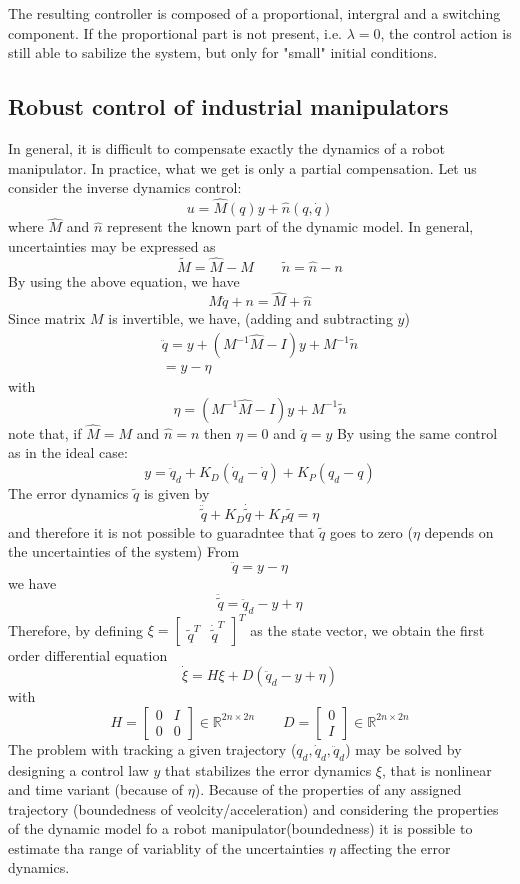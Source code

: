 \documentclass{book}
\begin{document}
The resulting controller is composed of a proportional, intergral and a switching component. If the proportional part is not present, i.e. $\lambda = 0$, the control action is still able to sabilize the system, but only for "small" initial conditions. 

\subsection{Robust control of industrial manipulators}
In general, it is difficult to compensate exactly the dynamics of a robot manipulator. In practice, what we get is only a partial compensation. Let us consider the inverse dynamics control:
\[
    u=\hat{M}(q)y+\hat{n}(q,\dot{q})
\]
where $\hat{M}$ and $\hat{n}$ represent the known part of the dynamic model. In general, uncertainties may be expressed as 
\[
    \tilde{M}=\hat{M}-M \qquad \tilde{n} = \hat{n} - n
\]
By using the above equation, we have
\[
    M\ddot{q}+n=\hat{M}+\hat{n}
\]
Since matrix $M$ is invertible, we have, (adding and subtracting $y$)
\begin{gather*}
    \ddot{q} = y + (M^{-1}\hat{M}-I)y+M^{-1}\tilde{n}\\
    =y-\eta
\end{gather*}
with
\[
    \eta = (M^{-1}\hat{M}-I)y+M^{-1}\tilde{n}
\]
note that, if $\hat{M}=M$ and $\hat{n}=n$ then $\eta=0$ and $\ddot{q}=y$
By using the same control as in the ideal case:
\[
    y=\ddot{q}_d+K_D(\dot{q}_d-\dot{q})+K_P(q_d-q)
\]
The error dynamics $\tilde{q}$ is given by 
\[
    \ddot{\tilde{q}}+K_D\dot{\tilde{q}} + K_P\tilde{q}=\eta
\]
and therefore it is not possible to guaradntee that $\tilde{q}$ goes to zero ($\eta$ depends on the uncertainties of the system)
From
\[
    \ddot{q}=y-\eta
\]
we have 
\[
    \ddot{\tilde{q}}=\ddot{q}_d-y+\eta
\]
Therefore, by defining $\xi = \begin{bmatrix}
    \tilde{q}^T  & \dot{\tilde{q}}^T
\end{bmatrix}^T $ as the state vector, we obtain the first order differential equation
\[
    \dot{\xi} = H\xi + D(\ddot{q}_d-y+\eta)
\]
with
\[
    H=\begin{bmatrix}
        0 & I \\ 0 & 0
    \end{bmatrix} \in \mathbb{R}^{2n\times 2n} \qquad D = \begin{bmatrix}
        0 \\ I
    \end{bmatrix} \in \mathbb{R}^{2n\times 2n}
\]
The problem with tracking a given trajectory ($q_d,\dot{q}_d,\ddot{q}_d$) may be solved by designing a control law $y$ that stabilizes the error dynamics $\xi$, that is nonlinear and time variant (because of $\eta$). Because of the properties of any assigned trajectory (boundedness of veolcity/acceleration) and considering the properties of the dynamic model fo a robot manipulator(boundedness) it is possible to estimate tha range of variablity of the uncertainties $\eta$ affecting the error dynamics. 
\end{document}
